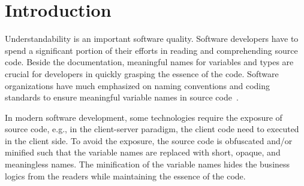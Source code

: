 \section{Introduction}
\label{intro:sec}

Understandability is an important software quality. Software
developers have to spend a significant portion of their efforts in
reading and comprehending source code. Beside the documentation,
meaningful names for variables and types are crucial for developers in
quickly grasping the essence of the code. Software organizations have
much emphasized on naming conventions and coding standards to ensure
meaningful variable names in source
code~\cite{barr-codeconvention-fse14}.



In modern software development, some technologies require the exposure
of source code, e.g., in the client-server paradigm, the client code
need to executed in the client side. To avoid the exposure, the source
code is obfuscated and/or minified such that the variable names are
replaced with short, opaque, and meaningless names. The minification
of the variable names hides the business logics from the readers while
maintaining the essence of the code. {\color{blue}{Code minification
    is a code protection mechanism that at least slows down those who
    have bad intentions because program code is a valuable asset to
    companies. In other cases, code minification improves rendering
    times because of payload size.}}



%
%

